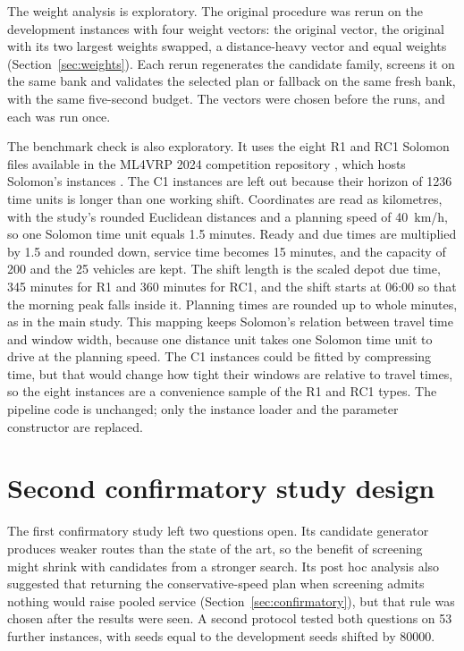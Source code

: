 \documentclass[11pt,a4paper]{article}
\begin{document}
The weight analysis is exploratory. The original procedure was rerun on the
development instances with four weight vectors: the original vector, the original
with its two largest weights swapped, a distance-heavy vector and equal weights
(Section~\ref{sec:weights}). Each rerun regenerates the candidate family,
screens it on the same bank and validates the selected plan or fallback on the
same fresh bank, with the same five-second budget. The vectors were chosen before
the runs, and each was run once.

The benchmark check is also exploratory. It uses the eight R1 and RC1 Solomon
files available in the ML4VRP 2024 competition repository \cite{ml4vrp2024},
which hosts Solomon's instances \cite{solomon1987}. The C1 instances are left out
because their horizon of 1236 time units is longer than one working shift.
Coordinates are read as kilometres, with the study's rounded Euclidean distances
and a planning speed of 40~km/h, so one Solomon time unit equals 1.5 minutes.
Ready and due times are multiplied by 1.5 and rounded down, service time becomes
15 minutes, and the capacity of 200 and the 25 vehicles are kept. The shift
length is the scaled depot due time, 345 minutes for R1 and 360 minutes for RC1,
and the shift starts at 06:00 so that the morning peak falls inside it. Planning
times are rounded up to whole minutes, as in the main study. This mapping keeps
Solomon's relation between travel time and window width, because one distance
unit takes one Solomon time unit to drive at the planning speed. The C1 instances
could be fitted by compressing time, but that would change how tight their
windows are relative to travel times, so the eight instances are a convenience
sample of the R1 and RC1 types. The pipeline code is unchanged; only the instance
loader and the parameter constructor are replaced.

\section{Second confirmatory study design}\label{sec:conf2design}

The first confirmatory study left two questions open. Its candidate generator
produces weaker routes than the state of the art, so the benefit of screening
might shrink with candidates from a stronger search. Its post hoc analysis also
suggested that returning the conservative-speed plan when screening admits
nothing would raise pooled service (Section~\ref{sec:confirmatory}), but that
rule was chosen after the results were seen. A second protocol tested both
questions on 53 further instances, with seeds equal to the development seeds
shifted by 80000.
\end{document}
